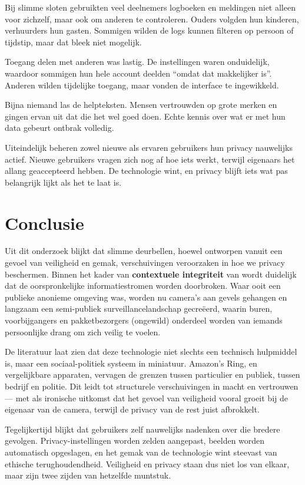 \documentclass[nonacm, sigconf, balance=true]{acmart}
\begin{document}
    Bij slimme sloten gebruikten veel deelnemers logboeken en meldingen niet alleen voor zichzelf, maar ook om anderen te controleren.
    Ouders volgden hun kinderen, verhuurders hun gasten.
    Sommigen wilden de logs kunnen filteren op persoon of tijdstip, maar dat bleek niet mogelijk.

    Toegang delen met anderen was lastig.
    De instellingen waren onduidelijk, waardoor sommigen hun hele account deelden ``omdat dat makkelijker is''.
    Anderen wilden tijdelijke toegang, maar vonden de interface te ingewikkeld.

    Bijna niemand las de helpteksten.
    Mensen vertrouwden op grote merken en gingen ervan uit dat die het wel goed doen.
    Echte kennis over wat er met hun data gebeurt ontbrak volledig.

    Uiteindelijk beheren zowel nieuwe als ervaren gebruikers hun privacy nauwelijks actief.
    Nieuwe gebruikers vragen zich nog af hoe iets werkt, terwijl eigenaars het allang geaccepteerd hebben.
    De technologie wint, en privacy blijft iets wat pas belangrijk lijkt als het te laat is.

    \section{Conclusie}
    Uit dit onderzoek blijkt dat slimme deurbellen, hoewel ontworpen vanuit een gevoel van veiligheid en gemak, verschuivingen veroorzaken in hoe we privacy beschermen.
    Binnen het kader van \textbf{contextuele integriteit} van \citeauthor{nissenbaum2009privacy} wordt duidelijk dat de oorspronkelijke informatiestromen worden doorbroken.
    Waar ooit een publieke anonieme omgeving was, worden nu camera's aan gevels gehangen en langzaam een semi-publiek surveillancelandschap gecreëerd, waarin buren, voorbijgangers en pakketbezorgers (ongewild) onderdeel worden van iemands persoonlijke drang om zich veilig te voelen.

    De literatuur laat zien dat deze technologie niet slechts een technisch hulpmiddel is, maar een sociaal-politiek systeem in miniatuur.
    Amazon’s Ring, en vergelijkbare apparaten, vervagen de grenzen tussen particulier en publiek, tussen bedrijf en politie.
    Dit leidt tot structurele verschuivingen in macht en vertrouwen — met als ironische uitkomst dat het gevoel van veiligheid vooral groeit bij de eigenaar van de camera, terwijl de privacy van de rest juist afbrokkelt.

    Tegelijkertijd blijkt dat gebruikers zelf nauwelijks nadenken over die bredere gevolgen.
    Privacy-instellingen worden zelden aangepast, beelden worden automatisch opgeslagen, en het gemak van de technologie wint steevast van ethische terughoudendheid.
    Veiligheid en privacy staan dus niet los van elkaar, maar zijn twee zijden van hetzelfde muntstuk.
\end{document}
